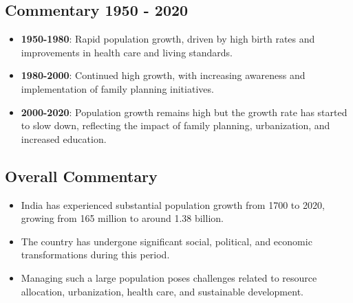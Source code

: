 \subsection*{Commentary 1950 - 2020}
\begin{itemize}
    \item \textbf{1950-1980}: Rapid population growth, driven by high birth rates and improvements in health care and living standards.
    \item \textbf{1980-2000}: Continued high growth, with increasing awareness and implementation of family planning initiatives.
    \item \textbf{2000-2020}: Population growth remains high but the growth rate has started to slow down, reflecting the impact of family planning, urbanization, and increased education.
\end{itemize}

\subsection*{Overall Commentary}
\begin{itemize}
    \item India has experienced substantial population growth from 1700 to 2020, growing from 165 million to around 1.38 billion.
    \item The country has undergone significant social, political, and economic transformations during this period.
    \item Managing such a large population poses challenges related to resource allocation, urbanization, health care, and sustainable development.
\end{itemize}
